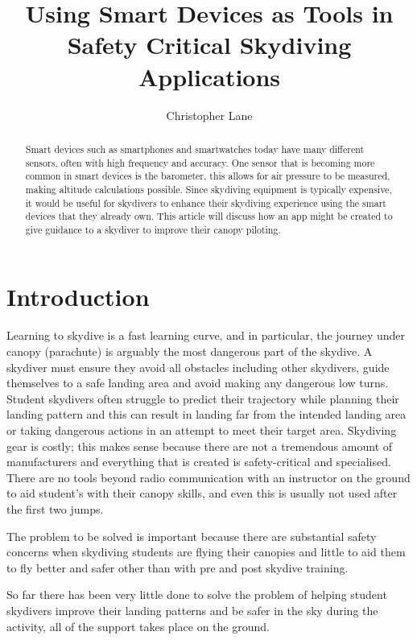 \documentclass[11pt, a4paper, twocolumn]{article}
\title{Using Smart Devices as Tools in Safety Critical Skydiving Applications}
\author{Christopher Lane}
\begin{document}
\maketitle

\begin{abstract} %
    Smart devices such as smartphones and smartwatches today have many different sensors, often with high frequency and accuracy. One sensor that is becoming more common in smart devices is the barometer, this allows for air pressure to be measured, making altitude calculations possible. Since skydiving equipment is typically expensive, it would be useful for skydivers to enhance their skydiving experience using the smart devices that they already own. This article will discuss how an app might be created to give guidance to a skydiver to improve their canopy piloting.
\end{abstract}

\section{Introduction}\label{sec:introduction} %

Learning to skydive is a fast learning curve, and in particular, the journey under canopy (parachute) is arguably the most dangerous part of the skydive. A skydiver must ensure they avoid all obstacles including other skydivers, guide themselves to a safe landing area and avoid making any dangerous low turns. Student skydivers often struggle to predict their trajectory while planning their landing pattern and this can result in landing far from the intended landing area or taking dangerous actions in an attempt to meet their target area.
Skydiving gear is costly; this makes sense because there are not a tremendous amount of manufacturers and everything that is created is safety-critical and specialised. There are no tools beyond radio communication with an instructor on the ground to aid student's with their canopy skills, and even this is usually not used after the first two jumps.

The problem to be solved is important because there are substantial safety concerns when skydiving students are flying their canopies and little to aid them to fly better and safer other than with pre and post skydive training.

So far there has been very little done to solve the problem of helping student skydivers improve their landing patterns and be safer in the sky during the activity, all of the support takes place on the ground.
\end{document}
